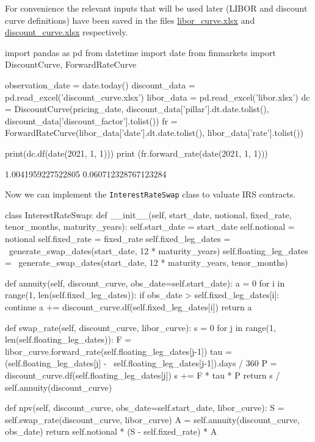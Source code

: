 For convenience the relevant inputs that will be used later (LIBOR and discount curve definitions) have been saved in the files  \href{https://drive.google.com/file/d/1dm5oZnZKmJM6UrV0L32OcqD5Tzs9SI9A/view?usp=sharing}{libor\_curve.xlsx} and \href{https://drive.google.com/file/d/14R22r7m-6VpQ_P79D3qHdK0QN_mOQ_UB/view?usp=sharing}{discount\_curve.xlsx} respectively.

\begin{ipython}
import pandas as pd
from datetime import date
from finmarkets import DiscountCurve, ForwardRateCurve

observation_date = date.today()
discount_data = pd.read_excel('discount_curve.xlsx')
libor_data = pd.read_excel('libor.xlsx')
dc = DiscountCurve(pricing_date,
discount_data['pillar'].dt.date.tolist(),
discount_data['discount_factor'].tolist())
fr = ForwardRateCurve(libor_data['date'].dt.date.tolist(),
libor_data['rate'].tolist())

print(dc.df(date(2021, 1, 1)))
print (fr.forward_rate(date(2021, 1, 1)))
\end{ipython}
\begin{ioutput}
1.0041959227522805
0.060712328767123284
\end{ioutput}

Now we can implement the \texttt{InterestRateSwap} class to valuate IRS
contracts.

\begin{ipython}
class InterestRateSwap:
    def __init__(self, start_date, notional,
        fixed_rate, tenor_months, maturity_years):
        self.start_date = start_date
        self.notional = notional
        self.fixed_rate = fixed_rate
        self.fixed_leg_dates = \
            generate_swap_dates(start_date, 12 * maturity_years)
        self.floating_leg_dates = \
            generate_swap_dates(start_date, 12 * maturity_years, tenor_months)
    
    def annuity(self, discount_curve, obs_date=self.start_date):
        a = 0
        for i in range(1, len(self.fixed_leg_dates)):
            if obs_date > self.fixed_leg_dates[i]:
                continue
            a += discount_curve.df(self.fixed_leg_dates[i])
        return a

    def swap_rate(self, discount_curve, libor_curve):
        s = 0
        for j in range(1, len(self.floating_leg_dates)):
            F = libor_curve.forward_rate(self.floating_leg_dates[j-1])
            tau = (self.floating_leg_dates[j] - \
                self.floating_leg_dates[j-1]).days / 360 
            P = discount_curve.df(self.floating_leg_dates[j])
            s += F * tau * P
        return s / self.annuity(discount_curve)

    def npv(self, discount_curve, obs_date=self.start_date, libor_curve):
        S = self.swap_rate(discount_curve, libor_curve)
        A = self.annuity(discount_curve, obs_date)
        return self.notional * (S - self.fixed_rate) * A
\end{ipython}

